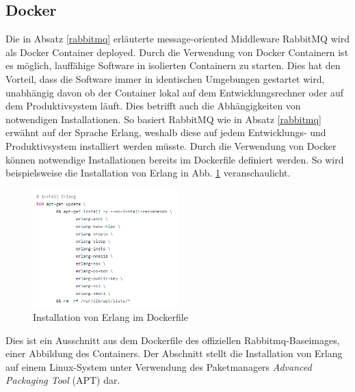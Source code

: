 \subsection{Docker}\label{Docker}
Die in Absatz \ref{rabbitmq} erläuterte message-oriented Middleware RabbitMQ wird als Docker Container deployed. Durch die Verwendung von Docker Containern ist es möglich, lauffähige Software in isolierten Containern zu starten. Dies hat den Vorteil, dass die Software immer in identischen Umgebungen gestartet wird, unabhängig davon ob der Container lokal auf dem Entwicklungsrechner oder auf dem Produktivsystem läuft. Dies betrifft auch die Abhängigkeiten von notwendigen Installationen. So basiert RabbitMQ wie in Absatz \ref{rabbitmq} erwähnt auf der Sprache Erlang, weshalb diese auf jedem Entwicklungs- und Produktivsystem installiert werden müsste. Durch die Verwendung von Docker können notwendige Installationen bereits im Dockerfile definiert werden. So wird beispielsweise die Installation von Erlang in Abb. \ref{img:erlangDockerfile} veranschaulicht. 

\begin{figure}[htbp]
	\centering
	\includegraphics[width=0.5\textwidth]{Bilder/erlangDockerfile.png}
	\caption{Installation von Erlang im Dockerfile}
	\label{img:erlangDockerfile}
\end{figure}
Dies ist ein Ausschnitt aus dem Dockerfile des offiziellen Rabbitmq-Baseimages, einer Abbildung des Containers. Der Abschnitt stellt die Installation von Erlang auf einem Linux-System unter Verwendung des Paketmanagers \textit{Advanced Packaging Tool} (APT) dar.
